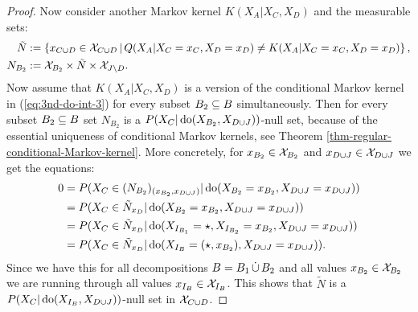 \begin{Prp}
\begin{proof}
Now consider another Markov kernel $K(X_A|X_C,X_D)$ and the measurable sets:
\begin{align*}
    \tilde N &:= \left \{ x_{C \cup D} \in \mathcal{X}_{C \cup D} \,\middle|\, Q(X_A|X_C=x_C,X_D=x_D) \neq K(X_A|X_C=x_C,X_D=x_D)  \right \},\\
    N_{B_2} &:= \mathcal{X}_{B_2} \times \tilde N \times \mathcal{X}_{J \setminus D}.
\end{align*}
Now assume that $K(X_A|X_C,X_D)$ is a version of the conditional Markov kernel in (\ref{eq:3nd-do-int-3})
for every subset $B_2 \subseteq B$ simultaneously. 
Then for every subset $B_2 \subseteq B$ set $N_{B_2}$ is a
$P(X_C|\operatorname{do}(X_{B_2},X_{D\cup J}))$-null set, because of the essential uniqueness of conditional Markov kernels, see Theorem \ref{thm-regular-conditional-Markov-kernel}. More concretely, for $x_{B_2} \in \mathcal{X}_{B_2}$ 
and $x_{D \cup J} \in \mathcal{X}_{D \cup J}$ we get the equations:
\begin{align*}
  0 &=P(X_C \in (N_{B_2})_{(x_{B_2},x_{D\cup J})} |\operatorname{do}(X_{B_2}=x_{B_2},X_{D\cup J}=x_{D \cup J})) \\
      &=P(X_C \in \tilde N_{x_D} |\operatorname{do}(X_{B_2}=x_{B_2},X_{D\cup J}=x_{D \cup J}))\\
      &=P(X_C \in \tilde N_{x_D} |\operatorname{do}(X_{I_{B_1}}=\star, X_{I_{B_2}}=x_{B_2},X_{D\cup J}=x_{D \cup J}))\\
      &=P(X_C \in \tilde N_{x_D} |\operatorname{do}(X_{I_B}=(\star,x_{B_2}),X_{D\cup J}=x_{D \cup J})).
\end{align*}
Since we have this for all decompositions $B=B_1 \,\dot{\cup}\, B_2$ and all values $x_{B_2} \in \mathcal{X}_{B_2}$ 
we are running through all values $x_{I_B} \in \mathcal{X}_{I_B}$. 
This shows that $\tilde N$ is a $P(X_C|\operatorname{do}(X_{I_B},X_{D\cup J}))$-null set in $\mathcal{X}_{C \cup D}$.
\end{proof}
\end{Prp}

